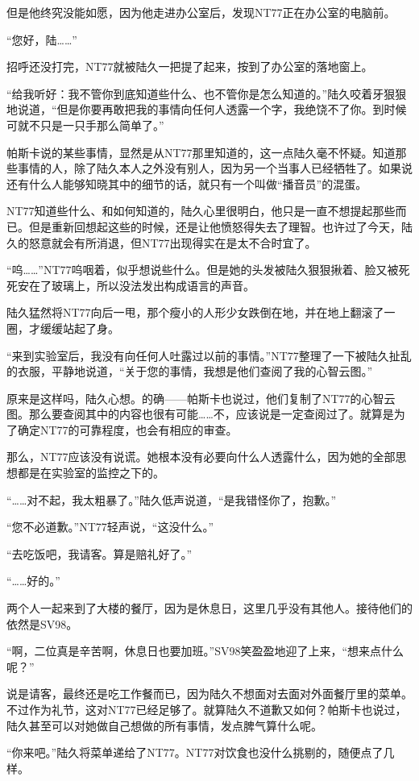但是他终究没能如愿，因为他走进办公室后，发现NT77正在办公室的电脑前。

“您好，陆……”

招呼还没打完，NT77就被陆久一把提了起来，按到了办公室的落地窗上。

“给我听好：我不管你到底知道些什么、也不管你是怎么知道的。”陆久咬着牙狠狠地说道，“但是你要再敢把我的事情向任何人透露一个字，我绝饶不了你。到时候可就不只是一只手那么简单了。”

帕斯卡说的某些事情，显然是从NT77那里知道的，这一点陆久毫不怀疑。知道那些事情的人，除了陆久本人之外没有别人，因为另一个当事人已经牺牲了。如果说还有什么人能够知晓其中的细节的话，就只有一个叫做“播音员”的混蛋。

NT77知道些什么、和如何知道的，陆久心里很明白，他只是一直不想提起那些而已。但是重新回想起这些的时候，还是让他愤怒得失去了理智。也许过了今天，陆久的怒意就会有所消退，但NT77出现得实在是太不合时宜了。

“呜……”NT77呜咽着，似乎想说些什么。但是她的头发被陆久狠狠揪着、脸又被死死安在了玻璃上，所以没法发出构成语言的声音。

陆久猛然将NT77向后一甩，那个瘦小的人形少女跌倒在地，并在地上翻滚了一圈，才缓缓站起了身。

“来到实验室后，我没有向任何人吐露过以前的事情。”NT77整理了一下被陆久扯乱的衣服，平静地说道，“关于您的事情，我想是他们查阅了我的心智云图。”

原来是这样吗，陆久心想。的确——帕斯卡也说过，他们复制了NT77的心智云图。那么要查阅其中的内容也很有可能……不，应该说是一定查阅过了。就算是为了确定NT77的可靠程度，也会有相应的审查。

那么，NT77应该没有说谎。她根本没有必要向什么人透露什么，因为她的全部思想都是在实验室的监控之下的。

“……对不起，我太粗暴了。”陆久低声说道，“是我错怪你了，抱歉。”

“您不必道歉。”NT77轻声说，“这没什么。”

“去吃饭吧，我请客。算是赔礼好了。”

“……好的。”

两个人一起来到了大楼的餐厅，因为是休息日，这里几乎没有其他人。接待他们的依然是SV98。

“啊，二位真是辛苦啊，休息日也要加班。”SV98笑盈盈地迎了上来，“想来点什么呢？”

说是请客，最终还是吃工作餐而已，因为陆久不想面对去面对外面餐厅里的菜单。不过作为礼节，这对NT77已经足够了。就算陆久不道歉又如何？帕斯卡也说过，陆久甚至可以对她做自己想做的所有事情，发点脾气算什么呢。

“你来吧。”陆久将菜单递给了NT77。NT77对饮食也没什么挑剔的，随便点了几样。

